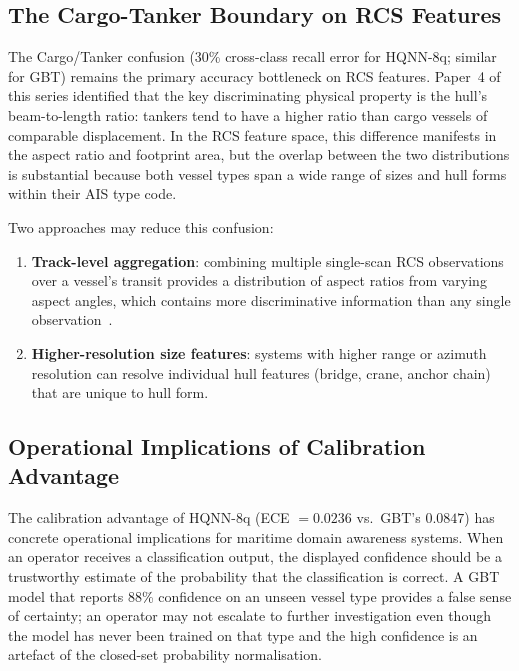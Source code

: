 \documentclass[journal]{IEEEtran}
\begin{document}
\subsection{The Cargo-Tanker Boundary on RCS Features}

The Cargo/Tanker confusion (30\% cross-class recall error for HQNN-8q;
similar for GBT) remains the primary accuracy bottleneck on RCS
features. Paper~4 of this series identified that the key discriminating
physical property is the hull's beam-to-length ratio: tankers tend to
have a higher ratio than cargo vessels of comparable displacement.
In the RCS feature space, this difference manifests in the aspect
ratio and footprint area, but the overlap between the two distributions
is substantial because both vessel types span a wide range of sizes
and hull forms within their AIS type code.

Two approaches may reduce this confusion:

\begin{enumerate}
  \item \textbf{Track-level aggregation}: combining multiple
        single-scan RCS observations over a vessel's transit provides
        a distribution of aspect ratios from varying aspect angles,
        which contains more discriminative information than any single
        observation~\cite{ward2013seaclutter}.
  \item \textbf{Higher-resolution size features}: systems with
        higher range or azimuth resolution can resolve individual hull
        features (bridge, crane, anchor chain) that are unique to hull
        form.
\end{enumerate}

\subsection{Operational Implications of Calibration Advantage}

The calibration advantage of HQNN-8q (ECE $= 0.0236$ vs.\ GBT's
$0.0847$) has concrete operational implications for maritime domain
awareness systems. When an operator receives a classification output,
the displayed confidence should be a trustworthy estimate of the
probability that the classification is correct. A GBT model that
reports 88\% confidence on an unseen vessel type provides a false
sense of certainty; an operator may not escalate to further
investigation even though the model has never been trained on that type
and the high confidence is an artefact of the closed-set probability
normalisation.
\end{document}
